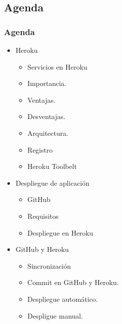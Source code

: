 \documentclass{beamer}
\begin{document}
\subsection{Agenda}
\begin{frame}
\frametitle{Agenda}
\begin{itemize}
\item Heroku
	\begin{itemize}
	\item Servicios en Heroku
	\item Importancia.
	\item Ventajas.
	\item Desventajas.
	\item Arquitectura.
	\item Registro
	\item Heroku Toolbelt
	\end{itemize}
\item Despliegue de aplicación
	\begin{itemize}
	\item GitHub
	\item Requisitos
	\item Despliegue en Heroku
	\end{itemize}
\item GitHub y Heroku
	\begin{itemize}
	\item Sincronización
	\item Commit en GitHub y Heroku.
	\item Despliegue automático.
	\item Despligue manual.
	\end{itemize}
\end{itemize}
\end{frame}
\end{document}

